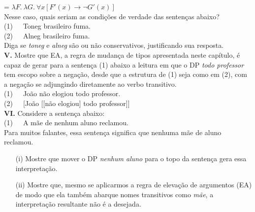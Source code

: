 \begin{tcolorbox}[parbox=false,boxrule=0pt,sharp corners,breakable]
\n {} = $\lambda F.\ \lambda G.\ \forall x [F'(x)
\rightarrow \neg G'(x)]$\\

\n Nesse caso, quais seriam as condições de verdade das sentenças
abaixo?\\

\n (1)\ \ \  Toneg brasileiro fuma.\\

\n (2)\ \ \  Alneg brasileiro fuma.\\

\n Diga se \textit{toneg} e \textit{alneg} são ou não
conservativos,
justificando sua resposta.\\

\n \textbf{V.} Mostre que EA, a regra de mudança de tipos
apresentada neste capítulo, é capaz de gerar para a sentença
(1) abaixo a leitura em que o DP \textit{todo professor} tem
escopo sobre a negação, desde que a estrutura de (1) seja como em (2), com a negação se adjungindo diretamente ao verbo transitivo.\\

\n (1)\ \ \  João não elogiou todo professor.\\

\n (2)\ \ \  [João [[não elogiou] todo professor]] \\

\n \textbf{VI.} Considere a sentença abaixo:\\

\n (1)\ \ \  A mãe de nenhum aluno reclamou.\\

\n Para muitos falantes, essa sentença significa que nenhuma mãe
de aluno reclamou.

\begin{enumerate}

\item[(i)] Mostre que mover o DP \textit{nenhum aluno} para o
    topo da sentença gera essa interpretação.

\item[(ii)] Mostre que, mesmo se aplicarmos a regra de elevação de argumentos (EA) de modo que ela também
    abarque nomes transitivos como \textit{mãe}, a
    interpretação resultante não é a desejada.

\end{enumerate}


\end{tcolorbox}













































